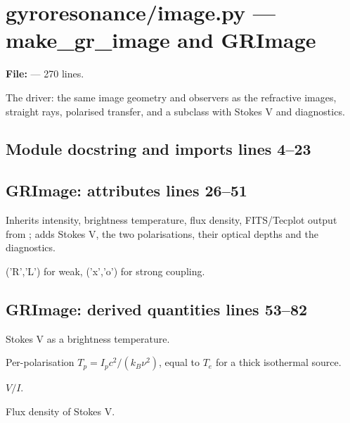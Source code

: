 \chapter{gyroresonance/image.py --- make\_gr\_image and GRImage}
\label{mod:gyroresonance:image.py}
\textbf{File:}  --- 270 lines.

The driver: the same image geometry and observers as the refractive images, straight
rays, polarised transfer, and a  subclass with Stokes V and diagnostics.

\section*{\normalsize Module docstring and imports \hfill{\small\mdseries\color{gray}lines 4--23}}

\section*{\normalsize GRImage: attributes \hfill{\small\mdseries\color{gray}lines 26--51}}

Inherits intensity, brightness temperature, flux density, FITS/Tecplot output from ; adds Stokes V, the two polarisations, their optical depths and the diagnostics.

\begin{lines}
\item[L.43] ('R','L') for weak, ('x','o') for strong coupling.
\end{lines}
\section*{\normalsize GRImage: derived quantities \hfill{\small\mdseries\color{gray}lines 53--82}}

\begin{lines}
\item[L.62] Stokes V as a brightness temperature.
\item[L.67] Per-polarisation $T_p=I_pc^2/(k_B\nu^2)$, equal to $T_e$ for a thick isothermal source.
\item[L.75] $V/I$.
\item[L.81] Flux density of Stokes V.
\end{lines}
